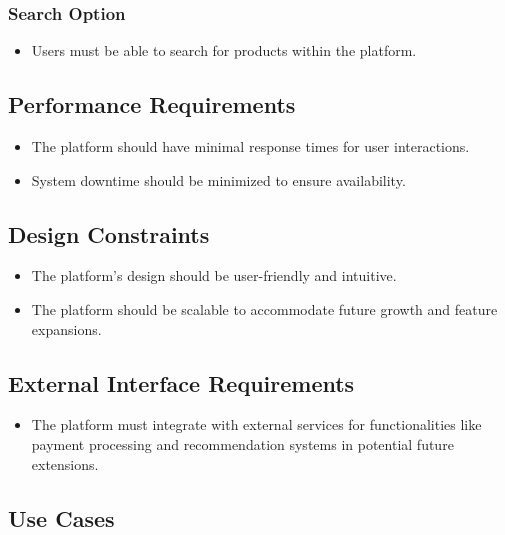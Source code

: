 \documentclass{article}
\begin{document}
\subsubsection{Search Option}
\begin{itemize}[label=-]
    \item Users must be able to search for products within the platform.
\end{itemize}

\subsection{Performance Requirements}
\begin{itemize}[label=-]
    \item The platform should have minimal response times for user interactions.
    \item System downtime should be minimized to ensure availability.
\end{itemize}

\subsection{Design Constraints}
\begin{itemize}[label=-]
    \item The platform's design should be user-friendly and intuitive.
    \item The platform should be scalable to accommodate future growth and feature expansions.
\end{itemize}

\subsection{External Interface Requirements}
\begin{itemize}[label=-]
    \item The platform must integrate with external services for functionalities like payment processing and recommendation systems in potential future extensions.
\end{itemize}



\subsection{Use Cases}
\end{document}
